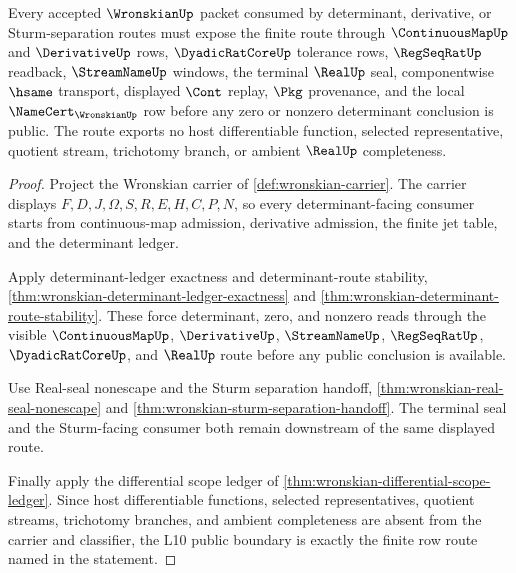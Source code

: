 \begin{theorem}
\label{thm:wronskian-l10-scope-binding}
Every accepted $\WronskianUp$ packet consumed by determinant, derivative, or Sturm-separation routes must expose the finite route through $\ContinuousMapUp$ and $\DerivativeUp$ rows, $\DyadicRatCoreUp$ tolerance rows, $\RegSeqRatUp$ readback, $\StreamNameUp$ windows, the terminal $\RealUp$ seal, componentwise $\hsame$ transport, displayed $\Cont$ replay, $\Pkg$ provenance, and the local $\NameCert_{\WronskianUp}$ row before any zero or nonzero determinant conclusion is public. The route exports no host differentiable function, selected representative, quotient stream, trichotomy branch, or ambient $\RealUp$ completeness.
\end{theorem}
\begin{proof}
Project the Wronskian carrier of \autoref{def:wronskian-carrier}. The carrier displays $F,D,J,\Omega,S,R,E,H,C,P,N$, so every determinant-facing consumer starts from continuous-map admission, derivative admission, the finite jet table, and the determinant ledger.

Apply determinant-ledger exactness and determinant-route stability, \autoref{thm:wronskian-determinant-ledger-exactness} and \autoref{thm:wronskian-determinant-route-stability}. These force determinant, zero, and nonzero reads through the visible $\ContinuousMapUp$, $\DerivativeUp$, $\StreamNameUp$, $\RegSeqRatUp$, $\DyadicRatCoreUp$, and $\RealUp$ route before any public conclusion is available.

Use Real-seal nonescape and the Sturm separation handoff, \autoref{thm:wronskian-real-seal-nonescape} and \autoref{thm:wronskian-sturm-separation-handoff}. The terminal seal and the Sturm-facing consumer both remain downstream of the same displayed route.

Finally apply the differential scope ledger of \autoref{thm:wronskian-differential-scope-ledger}. Since host differentiable functions, selected representatives, quotient streams, trichotomy branches, and ambient completeness are absent from the carrier and classifier, the L10 public boundary is exactly the finite row route named in the statement.
\end{proof}

